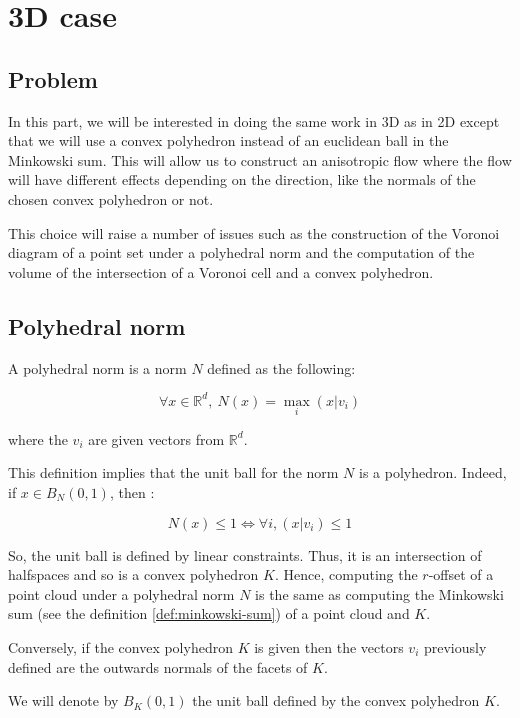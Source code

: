 \chapter{3D case}

\section{Problem}

In this part, we will be interested in doing the same work in 3D as in 2D except
that we will use a convex polyhedron instead of an euclidean ball in the
Minkowski sum. This will allow us to construct an anisotropic flow where the
flow will have different effects depending on the direction, like the normals of
the chosen convex polyhedron or not.

This choice will raise a number of issues such as the construction of the
Voronoi diagram of a point set under a polyhedral norm and the computation of
the volume of the intersection of a Voronoi cell and a convex polyhedron.

\section{Polyhedral norm}
A polyhedral norm is a norm $ N $ defined as the following:

$$ \forall x \in \mathbb{R}^d,~ N(x) = \max_{i} (x | v_i) $$

where the $ v_i $ are given vectors from $ \mathbb{R}^d $.

This definition implies that the unit ball for the norm $ N $ is a polyhedron.
Indeed, if $ x \in B_N(0, 1) $, then :

$$ N(x) \leq 1 \Longleftrightarrow \forall i, (x | v_i) \leq 1 $$

So, the unit ball is defined by linear constraints. Thus, it is an intersection
of halfspaces and so is a convex polyhedron $ K $. Hence, computing the $ r $-offset
of a point cloud under a polyhedral norm $ N $ is the same as computing the
Minkowski sum (see the definition \ref{def:minkowski-sum}) of a point cloud and $ K $.

Conversely, if the convex polyhedron $ K $ is given then the vectors $ v_i $
previously defined are the outwards normals of the facets of $ K $.

We will denote by $ B_K(0, 1) $ the unit ball defined by the convex polyhedron $ K $.

